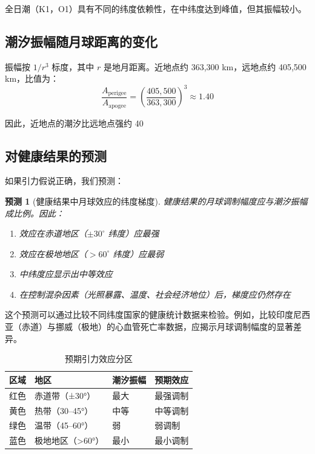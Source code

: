\documentclass[12pt,a4paper]{article}
\newtheorem{prediction}[theorem]{预测}
\theoremstyle{remark}
\begin{document}
	全日潮（K1，O1）具有不同的纬度依赖性，在中纬度达到峰值，但其振幅较小。
	
	\subsection{潮汐振幅随月球距离的变化}
	
	振幅按 \(1/r^3\) 标度，其中 \(r\) 是地月距离。近地点约 363,300 km，远地点约 405,500 km，比值为：
	\[
	\frac{A_{\text{perigee}}}{A_{\text{apogee}}} = \left(\frac{405,500}{363,300}\right)^3 \approx 1.40
	\]
	
	因此，近地点的潮汐比远地点强约 40%
	
	\subsection{对健康结果的预测}
	
	如果引力假说正确，我们预测：
	
	\begin{prediction}[健康结果中月球效应的纬度梯度]
		健康结果的月球调制幅度应与潮汐振幅成比例。因此：
		\begin{enumerate}
			\item 效应在赤道地区（\(\pm 30^\circ\) 纬度）应最强
			\item 效应在极地地区（\(>60^\circ\) 纬度）应最弱
			\item 中纬度应显示出中等效应
			\item 在控制混杂因素（光照暴露、温度、社会经济地位）后，梯度应仍然存在
		\end{enumerate}
	\end{prediction}
	
	这个预测可以通过比较不同纬度国家的健康统计数据来检验。例如，比较印度尼西亚（赤道）与挪威（极地）的心血管死亡率数据，应揭示月球调制幅度的显著差异。
	
	\begin{table}[htbp]
		\centering
		\caption{预期引力效应分区}
		\label{tab:zonation}
		\small
		\begin{tabular}{clll}
			\toprule
			\textbf{区域} & \textbf{地区} & \textbf{潮汐振幅} & \textbf{预期效应} \\
			\midrule
			红色 & 赤道带（±30°） & 最大 & 最强调制 \\
			黄色 & 热带（30–45°） & 中等 & 中等调制 \\
			绿色 & 温带（45–60°） & 弱 & 弱调制 \\
			蓝色 & 极地地区（>60°） & 最小 & 最小调制 \\
			\bottomrule
		\end{tabular}
	\end{table}
	
\end{document}
